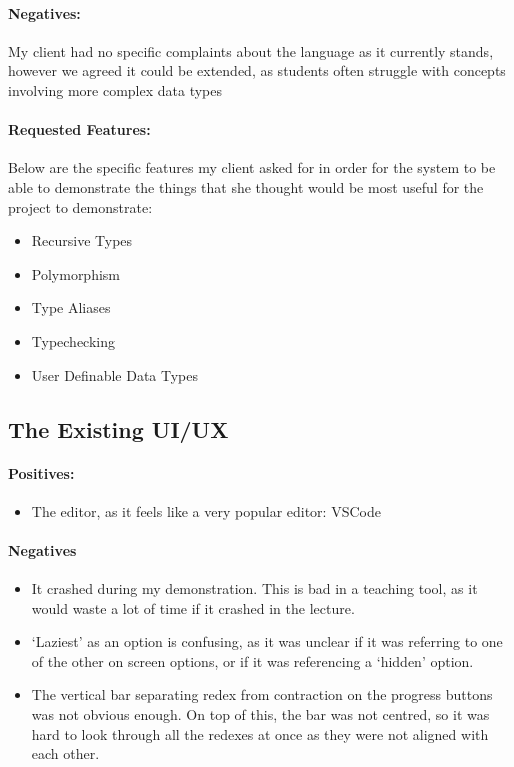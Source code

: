\paragraph{Negatives:}
My client had no specific complaints about the language as it currently stands, however we agreed it could be extended, as students often struggle with concepts involving more complex data types

\paragraph{Requested Features:}
Below are the specific features my client asked for in order for the system to be able to demonstrate the things that she thought would be most useful for the project to demonstrate:
\begin{itemize}
    \item Recursive Types
    \item Polymorphism
    \item Type Aliases
    \item Typechecking
    \item User Definable Data Types
\end{itemize}

\subsection{The Existing UI/UX}
\paragraph{Positives:}
\begin{itemize}
    \item The editor, as it feels like a very popular editor: VSCode
\end{itemize}

\paragraph{Negatives}
\begin{itemize}
    \item It crashed during my demonstration. This is bad in a teaching tool, as it would waste a lot of time if it crashed in the lecture. 
    \item `Laziest' as an option is confusing, as it was unclear if it was referring to one of the other on screen options, or if it was referencing a `hidden' option.
    \item The vertical bar separating redex from contraction on the progress buttons was not obvious enough. On top of this, the bar was not centred, so it was hard to look through all the redexes at once as they were not aligned with each other. 
\end{itemize}

